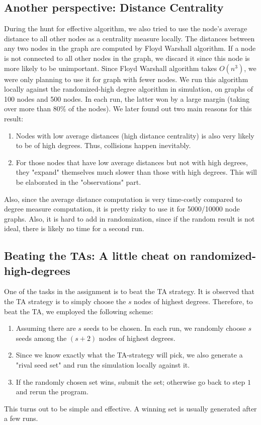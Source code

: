 \documentclass[12pt]{article}
\begin{document}
\subsection{Another perspective: Distance Centrality}
During the hunt for effective algorithm, we also tried to use the node's average distance to all other nodes as a centrality measure locally. The distances between any two nodes in the graph are computed by Floyd Warshall algorithm. If a node is not connected to all other nodes in the graph, we discard it since this node is more likely to be unimportant.
Since Floyd Warshall algorithm takes $O(n^3)$, we were only planning to use it for graph with fewer nodes. We run this algorithm locally against the randomized-high degree algorithm in simulation, on graphs of 100 nodes and 500 nodes. In each run, the latter won by a large margin (taking over more than 80\% of the nodes). We later found out two main reasons for this result:
\begin{enumerate}
\item Nodes with low average distances (high distance centrality) is also very likely to be of high degrees. Thus, collisions happen inevitably. 
\item For those nodes that have low average distances but not with high degrees, they "expand" themselves much slower than those with high degrees. This will be elaborated in the "observations" part. 
\end{enumerate}
Also, since the average distance computation is very time-costly compared to degree measure computation, it is pretty risky to use it for 5000/10000 node graphs. Also, it is hard to add in randomization, since if the random result is not ideal, there is likely no time for a second run. 

\subsection{Beating the TAs: A little cheat on randomized-high-degrees}
One of the tasks in the assignment is to beat the TA strategy. It is observed that the TA strategy is to simply choose the $s$ nodes of highest degrees. Therefore, to beat the TA, we employed the following scheme:
\begin{enumerate}
\item Assuming there are $s$ seeds to be chosen. In each run, we randomly choose $s$ seeds among the $(s+2)$ nodes of highest degrees. 
\item Since we know exactly what the TA-strategy will pick, we also generate a "rival seed set" and run the simulation locally against it. 
\item If the randomly chosen set wins, submit the set; otherwise go back to step $1$ and rerun the program. 
\end{enumerate}
This turns out to be simple and effective. A winning set is usually generated after a few runs. 
\end{document}
